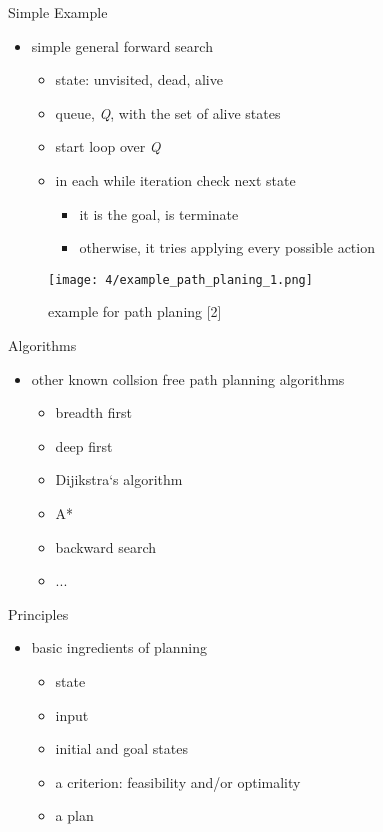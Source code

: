 \documentclass[%
  professionalfonts,%
  xcolor={%
    usenames,%
    dvipsnames,%
    svgnames,%
    table,%
    hyperref%
  }%
]{beamer}
\begin{document}
      \begin{frame}{Simple Example}
        \begin{itemize}
          \item simple general forward search
          \begin{itemize}
            \item state: unvisited, dead, alive
            \item queue, \emph{Q}, with the set of alive states
            \item start loop over \emph{Q}
            \item in each while iteration check next state
            \begin{itemize}
              \item it is the goal, is terminate
              \item otherwise, it tries applying every possible action
             \end{itemize} 
          \end{itemize}
        \end{itemize}
        \begin{figure}[h]
          \texttt{[image: 4/example\_path\_planing\_1.png]}
          \caption{example for path planing [2]}
          \label{fig:example path planing 1}
        \end{figure}
      \end{frame}
      
      \begin{frame}{Algorithms}
        \begin{itemize}
          \item other known collsion free path planning algorithms
          \begin{itemize}
            \item breadth first
            \item deep first
            \item Dijikstra‘s algorithm
            \item A*
            \item backward search
            \item ...
          \end{itemize}
        \end{itemize}
      \end{frame}

      \begin{frame}{Principles}
        \begin{itemize}
          \item basic ingredients of planning
          \begin{itemize}
            \item state
            \item input
            \item initial and goal states
            \item a criterion: feasibility and/or optimality
            \item a plan
          \end{itemize}
        \end{itemize}
      \end{frame}
    
\end{document}
